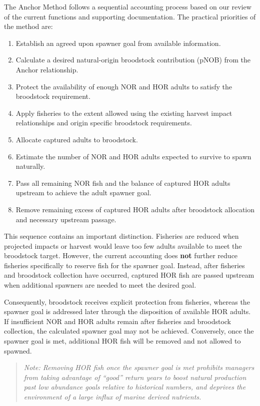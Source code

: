 \documentclass[12pt,letterpaper]{article}
\providecommand{\tightlist}{%
  \setlength{\itemsep}{0pt}\setlength{\parskip}{0pt}}
\begin{document}
The Anchor Method follows a sequential accounting process based on our review of the current functions and supporting documentation. The practical priorities of the method are:

\begin{enumerate}
\def\labelenumi{\arabic{enumi}.}
\tightlist
\item
  Establish an agreed upon spawner goal from available information.
\item
  Calculate a desired natural-origin broodstock contribution (pNOB) from the Anchor relationship.
\item
  Protect the availability of enough NOR and HOR adults to satisfy the broodstock requirement.
\item
  Apply fisheries to the extent allowed using the existing harvest impact relationships and origin specific broodstock requirements.
\item
  Allocate captured adults to broodstock.
\item
  Estimate the number of NOR and HOR adults expected to survive to spawn naturally.
\item
  Pass all remaining NOR fish and the balance of captured HOR adults upstream to achieve the adult spawner goal.
\item
  Remove remaining excess of captured HOR adults after broodstock allocation and necessary upstream passage.
\end{enumerate}

This sequence contains an important distinction. Fisheries are reduced when projected impacts or harvest would leave too few adults available to meet the broodstock target. However, the current accounting does \textbf{not} further reduce fisheries specifically to reserve fish for the spawner goal. Instead, after fisheries and broodstock collection have occurred, captured HOR fish are passed upstream when additional spawners are needed to meet the desired goal.

Consequently, broodstock receives explicit protection from fisheries, whereas the spawner goal is addressed later through the disposition of available HOR adults. If insufficient NOR and HOR adults remain after fisheries and broodstock collection, the calculated spawner goal may not be achieved. Conversely, once the spawner goal is met, additional HOR fish will be removed and not allowed to spawned.

\begin{quote}
\emph{Note: Removing HOR fish once the spawner goal is met prohibits managers from taking advantage of ``good'' return years to boost natural production past low abundance goals relative to historical numbers, and deprives the environment of a large influx of marine derived nutrients.}
\end{quote}
\end{document}
